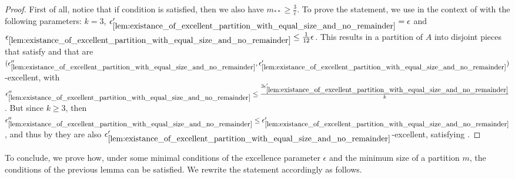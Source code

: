 \begin{lemma}
\begin{enumerate}[label={\roman*}., ref={\roman*}, font=\rmfamily]
            \end{enumerate}
            \begin{proof}
                First of all, notice that if condition 
                is satisfied, then we also have $m_{**} \geq \frac{3}{\epsilon}$.
                To prove the statement, we use 
                in the context of  with the following parameters: $k = 3$,
                ${\epsilon'_{\ref{lem:existance_of_excellent_partition_with_equal_size_and_no_remainder}}} = \epsilon$
                and ${\epsilon_{\ref{lem:existance_of_excellent_partition_with_equal_size_and_no_remainder}}} \leq \frac{1}{12} \epsilon$.
                This results in a partition of $A$ into disjoint pieces that satisfy
                 and that are
                $( {\epsilon''_{\ref{lem:existance_of_excellent_partition_with_equal_size_and_no_remainder}}},
                    \epsilon'_{\ref{lem:existance_of_excellent_partition_with_equal_size_and_no_remainder}} )$-excellent,
                with ${\epsilon''_{\ref{lem:existance_of_excellent_partition_with_equal_size_and_no_remainder}}} \leq
                    \frac{3 \epsilon'_{\ref{lem:existance_of_excellent_partition_with_equal_size_and_no_remainder}}}{k}$.
                But since $k \geq 3$, then ${\epsilon''_{\ref{lem:existance_of_excellent_partition_with_equal_size_and_no_remainder}}} \leq
                    \epsilon'_{\ref{lem:existance_of_excellent_partition_with_equal_size_and_no_remainder}}$, and thus
                by  they are also
                $\epsilon'_{\ref{lem:existance_of_excellent_partition_with_equal_size_and_no_remainder}}$-excellent, satisfying
                .
            \end{proof}
        \end{lemma}

        To conclude, we prove how, under some minimal conditions
        of the excellence parameter $\epsilon$ and the minimum size of a partition $m$,
        the conditions of the previous lemma can be satisfied.
        We rewrite the statement accordingly as follows.

